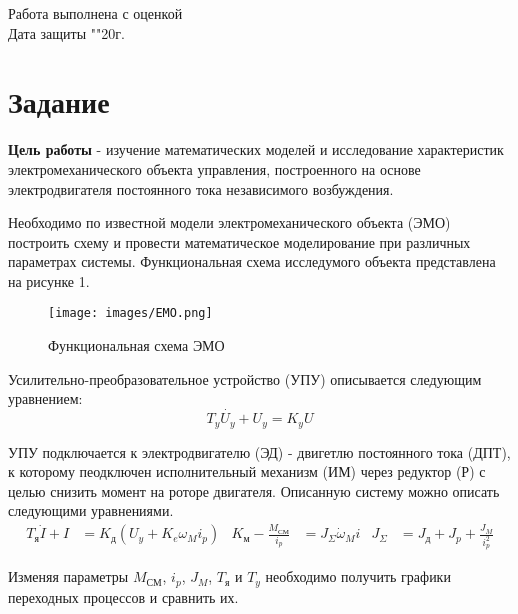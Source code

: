\documentclass[a4paper, 12pt]{article}
\begin{document}
\begin{titlepage}
	Работа выполнена с оценкой \hspace{1cm} \underline{\hspace{8cm}} \\ 
	\vspace{1cm}
	Дата защиты "\underline{\hspace{0.7cm}}"\hspace{0.2cm}\underline{\hspace{2cm}}\hspace{0.2cm}20\underline{\hspace{0.7cm}}г.
	
\end{titlepage}


\section*{\centering Задание}
\textbf{Цель работы} - изучение математических моделей и исследование характеристик электромеханического объекта управления, построенного на основе электродвигателя постоянного тока независимого возбуждения. \par
Необходимо по известной модели электромеханического объекта (ЭМО) построить схему и провести математическое моделирование при различных параметрах системы. Функциональная схема исследумого объекта представлена на рисунке 1.
\begin{figure} [h!]
    \centering
    \texttt{[image: images/EMO.png]}
    \caption{Функциональная схема ЭМО}
\end{figure} \par
Усилительно-преобразовательное устройство (УПУ) описывается следующим уравнением:
\begin{equation}
    T_y\dot{U_y} + U_y = K_yU
\end{equation} \par
УПУ подключается к электродвигателю (ЭД) - двигетлю постоянного тока (ДПТ), к которому пеодключен исполнительный механизм (ИМ) через редуктор (Р) с целью снизить момент на роторе двигателя. Описанную систему можно описать следующими уравнениями.
\begin{align}
    T_\text{я}\dot{I} + I & = K_\text{д}(U_y + K_e\omega_Mi_p) &
    K_\text{м} - \frac{M_\text{СМ}}{i_p} & = J_\Sigma\dot{\omega}_Mi &
    J_\Sigma & = J_\text{д} + J_p + \frac{J_M}{i_p^2}
\end{align} \par
Изменяя параметры $M_\text{СМ}$, $i_p$, $J_M$, $T_\text{я}$ и $T_y$ необходимо получить графики переходных процессов и сравнить их.
\end{document}
